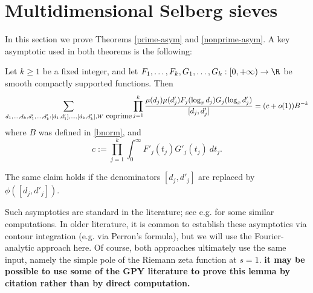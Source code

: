 \section{Multidimensional Selberg sieves}\label{sieving-sec}

In this section we prove Theorems \ref{prime-asym} and \ref{nonprime-asym}.  A key asymptotic used in both theorems is the following:

\begin{lemma}[Asymptotic]\label{mul-asym}  Let $k \geq 1$ be a fixed integer, and let $F_1,\dots,F_k,G_1,\dots,G_k: [0,+\infty)\to \R$ be smooth compactly supported functions.  Then
\begin{equation}\label{multisum}
 \sum_{d_1,\dots,d_k,d'_1,\dots,d'_k: [d_1,d'_1],\dots,[d_k,d'_k], W \hbox{ coprime}} \prod_{j=1}^k \frac{\mu(d_j) \mu(d'_j) F_j( \log_x d_j ) G_j( \log_x d'_j)}{[d_j,d'_j]} = (c+o(1)) B^{-k}
\end{equation}
where $B$ was defined in \eqref{bnorm}, and
$$ c := \prod_{j=1}^k \int_0^\infty F'_j(t_j) G'_j(t_j)\ dt_j.$$

The same claim holds if the denominators $[d_j,d'_j]$ are replaced by $\phi([d_j,d'_j])$.
\end{lemma}

Such asymptotics are standard in the literature; see e.g. \cite{gy} for some similar computations.  In older literature, it is common to establish these asymptotics via contour integration (e.g. via Perron's formula), but we will use the Fourier-analytic approach here.  Of course, both approaches ultimately use the same input, namely the simple pole of the Riemann zeta function at $s=1$.  {\bf it may be possible to use some of the GPY literature to prove this lemma by citation rather than by direct computation.}

